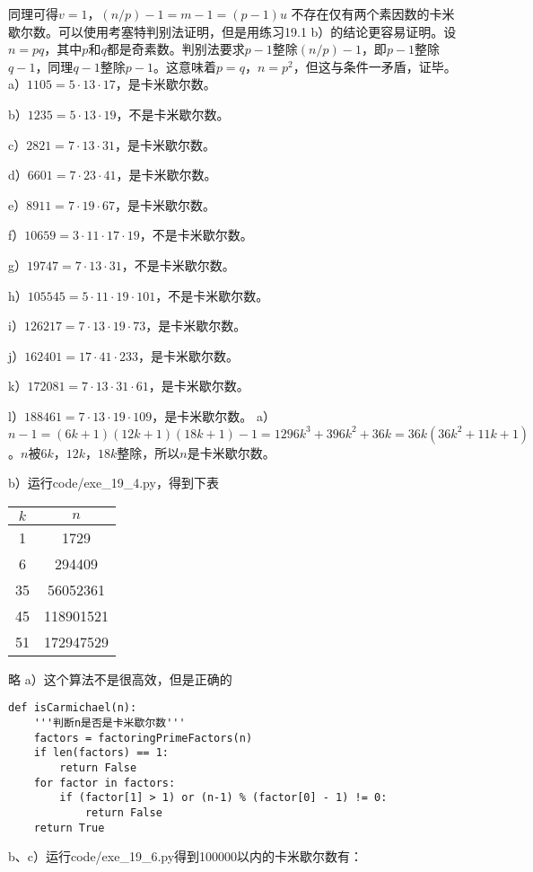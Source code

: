 同理可得$v=1$，$(n/p) - 1 = m-1=(p-1)u$
%
\exercise 不存在仅有两个素因数的卡米歇尔数。可以使用考塞特判别法证明，但是用练习19.1 b）的结论更容易证明。设$n=pq$，其中$p$和$q$都是奇素数。判别法要求$p-1$整除$(n/p)-1$，即$p-1$整除$q-1$，同理$q-1$整除$p-1$。这意味着$p=q$，$n=p^2$，但这与条件一矛盾，证毕。
%
\exercise a）$1105=5\cdot13\cdot17$，是卡米歇尔数。\par
b）$1235=5\cdot13\cdot19$，不是卡米歇尔数。\par
c）$2821=7\cdot13\cdot31$，是卡米歇尔数。\par
d）$6601=7\cdot23\cdot41$，是卡米歇尔数。\par
e）$8911=7\cdot19\cdot67$，是卡米歇尔数。\par
f）$10659=3\cdot11\cdot17\cdot19$，不是卡米歇尔数。\par
g）$19747=7\cdot13\cdot31$，不是卡米歇尔数。\par
h）$105545=5\cdot11\cdot19\cdot101$，不是卡米歇尔数。\par
i）$126217=7\cdot13\cdot19\cdot73$，是卡米歇尔数。\par
j）$162401=17\cdot41\cdot233$，是卡米歇尔数。\par
k）$172081=7\cdot13\cdot31\cdot61$，是卡米歇尔数。\par
l）$188461=7\cdot13\cdot19\cdot109$，是卡米歇尔数。
%
\exercise a）\proof $n-1=(6k+1)(12k+1)(18k+1)-1=1296k^3+396k^2+36k=36k(36k^2+11k+1)$。$n$被$6k$，$12k$，$18k$整除，所以$n$是卡米歇尔数。\par
b）运行code/exe\_19\_4.py，得到下表
\begin{center}
\begin{tabular}{c|c}
$k$ & $n$ \\
\hline
1 & 1729 \\
6 & 294409 \\
35 & 56052361 \\
45 & 118901521 \\
51 & 172947529 \\
\end{tabular}
\end{center}
%
\exercise 略
%
\exercise a）这个算法不是很高效，但是正确的
\begin{lstlisting}
def isCarmichael(n):
    '''判断n是否是卡米歇尔数'''
    factors = factoringPrimeFactors(n)
    if len(factors) == 1:
        return False
    for factor in factors:
        if (factor[1] > 1) or (n-1) % (factor[0] - 1) != 0:
            return False
    return True
\end{lstlisting}
b、c）运行code/exe\_19\_6.py得到100000以内的卡米歇尔数有：
